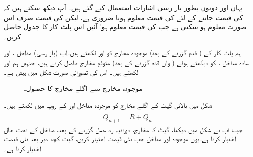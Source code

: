 یہاں  اور  دونوں بطور  باز رسی اشارات استعمال کیے گئے ہیں۔ آپ دیکھ سکتے ہیں کہ  کی قیمت جاننے کے لئے  کی قیمت معلوم ہونا ضروری ہے، لیکن  کی قیمت صرف اس صورت معلوم ہو سکتی ہے جب  کی قیمت معلوم ہو! آئیں اس پلٹ کار  کا جدول حاصل کریں۔

ہم پلٹ کار کے (  قدم   گزرنے کے بعد)  موجودہ مخارج کو  اور   لکھتے ہیں۔اب  (باز رسی)  مداخل
    ،   اور سادہ مداخل   ،  کو دیکھتے ہوئے (  واں قدم  گزرنے  کے بعد)   متوقع  مخارج حاصل کرتے ہیں، جنہیں ہم   اور  لکھتے ہیں۔ اس   کی تصوراتی صورت
 شکل  میں پیش ہے۔

\begin{figure}
\centering
{}
\caption{موجودہ مخارج  سے اگلے مخارج کا حصول۔}
\label{شکل_ترتیبی_اگلا_مخارج}
\end{figure}

شکل  میں   بالائی  گیٹ  کے اگلے  مخارج    کو موجودہ مداخل     اور  کے روپ میں لکھتے ہیں۔
 \begin{align}\label{مساوات_ترتیبی_اگلا_کیو}
 Q_{n+1}=\overline{R+\overline{Q}_n}
 \end{align}
 جیسا آپ نے شکل  میں دیکھا، گیٹ کا مخارج،  دورانیہ رد عمل گزرنے کے بعد،  مداخل کے تحت  حال اختیار کرتا ہے۔یوں موجودہ      اور مداخل    جب نئی قیمت اختیار کریں،  گیٹ کچھ دیر بعد نئی قیمت  اختیار کرتا ہے۔
 
